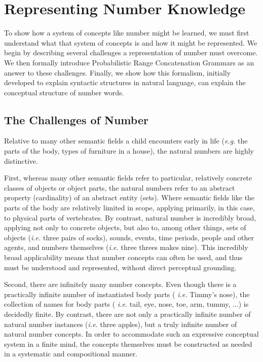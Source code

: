 \documentclass[10pt,letterpaper]{article}
\begin{document}
\section{Representing Number Knowledge}

To show how a system of concepts like number might be learned, we must
first understand what that system of concepts is and how it might be
represented. We begin by describing several challenges a
representation of number must overcome. We then formally introduce
Probabilistic Range Concatenation Grammars as an answer to these
challenges. Finally, we show how this formalism, initially developed
to explain syntactic structures in natural language, can explain the
conceptual structure of number words.

\subsection{The Challenges of Number}

Relative to many other semantic fields a child encounters early in
life ({\it e.g.} the parts of the body, types of furniture in a
house), the natural numbers are highly distinctive.

First, whereas many other semantic fields refer to particular,
relatively concrete classes of objects or object parts, the natural
numbers refer to an abstract property (cardinality) of an abstract
entity (sets). Where semantic fields like the parts of the body are
relatively limited in scope, applying primarily, in this case, to
physical parts of vertebrates. By contrast, natural number is
incredibly broad, applying not only to concrete objects, but also to,
among other things, sets of objects ({\it i.e.}  three pairs of
socks), sounds, events, time periods, people and other agents, and
numbers themselves ({\it i.e.}  three threes makes nine). This
incredibly broad applicability means that number concepts can often be
used, and thus must be understood and represented, without direct
perceptual grounding.

Second, there are infinitely many number concepts. Even though there
is a practically infinite number of instantiated body parts ({\it
  i.e.} Timmy's nose), the collection of names for body parts ({\it
  i.e.} tail, eye, nose, toe, arm, tummy, ...) is decidedly finite. By
contrast, there are not only a practically infinite number of natural
number instances ({\it i.e.}  three apples), but a truly infinite
number of natural number concepts. In order to accommodate such an
expressive conceptual system in a finite mind, the concepts themselves
must be constructed as needed in a systematic and compositional
manner.
\end{document}
